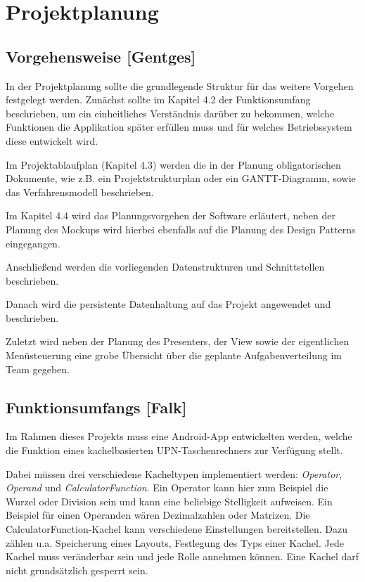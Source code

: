 \section{Projektplanung}

\subsection{Vorgehensweise [Gentges]}

In der Projektplanung sollte die grundlegende Struktur für das weitere Vorgehen festgelegt werden. Zunächst sollte im Kapitel 4.2 der Funktionsumfang beschrieben, um ein einheitliches Verständnis darüber zu bekommen, welche Funktionen die Applikation später erfüllen muss und für welches Betriebssystem diese entwickelt wird. 

Im Projektablaufplan (Kapitel 4.3) werden die in der Planung obligatorischen Dokumente, wie z.B. ein Projektstrukturplan oder ein GANTT-Diagramm, sowie das Verfahrensmodell beschrieben.

Im Kapitel 4.4 wird das Planungsvorgehen der Software erläutert, neben der Planung des Mockups wird hierbei ebenfalls auf die Planung des Design Patterns eingegangen.

Anschließend werden die vorliegenden Datenstrukturen und Schnittstellen beschrieben. 

Danach wird die persistente Datenhaltung auf das Projekt angewendet und beschrieben. 

Zuletzt wird neben der Planung des Presenters, der View sowie der eigentlichen Menüsteuerung eine grobe Übersicht über die geplante Aufgabenverteilung im Team gegeben. 

\clearpage

\subsection{Funktionsumfangs [Falk]}

Im Rahmen dieses Projekts muss eine Android-App entwickelten werden, welche die Funktion eines kachelbasierten UPN-Taschenrechners zur Verfügung stellt. 

Dabei müssen drei verschiedene Kacheltypen implementiert werden: \textit{Operator}, \textit{Operand} und \textit{CalculatorFunction}. Ein Operator kann hier zum Beispiel die Wurzel oder Division sein und kann eine beliebige Stelligkeit aufweisen. Ein Beispiel für einen Operanden wären Dezimalzahlen oder Matrizen. Die CalculatorFunction-Kachel kann verschiedene Einstellungen bereitstellen. Dazu zählen u.a. Speicherung eines Layouts, Festlegung des Typs einer Kachel. Jede Kachel muss veränderbar sein und jede Rolle annehmen können. Eine Kachel darf nicht grundsätzlich gesperrt sein. 

